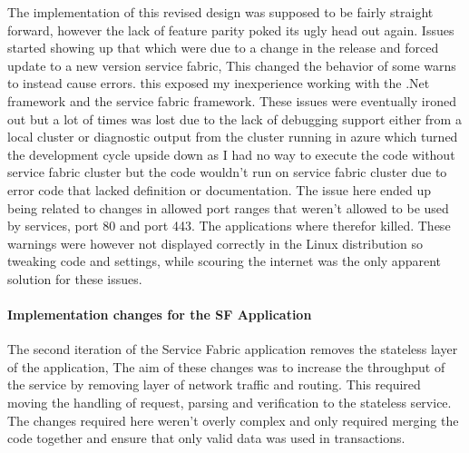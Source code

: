 \documentclass[a4paper,10pt,titlepage]{report}
\begin{document}
The implementation of this  revised design was supposed to be fairly straight forward, however the lack of feature parity poked its ugly head out again. Issues started showing up that which were due to a change in the release and forced update to a new version service fabric, This changed the behavior of some warns to instead cause errors. this exposed my inexperience working with the .Net framework and the service fabric framework. These issues were eventually ironed out but a lot of times was lost due to the lack of debugging support either from a local cluster or diagnostic output from the cluster running in azure which turned the development cycle upside down as I had no way to execute the code without service fabric cluster but the code wouldn't run on service fabric cluster due to error code that lacked definition or documentation. The issue here ended up being related to changes in allowed port ranges that weren't allowed to be used by services, port 80 and port 443. The applications where therefor killed. These warnings were however not displayed correctly in the Linux distribution so tweaking code and settings, while scouring the internet was the only apparent solution for these issues.

\paragraph*{Implementation changes for the SF Application}
The second iteration of the Service Fabric application removes the stateless layer of the application, The aim of these changes was to increase the throughput of the service by removing  layer of network traffic and routing. This required moving the handling of request, parsing and verification to the stateless service.   \\

The changes required here weren't overly complex and only required merging the code together and ensure that only valid data was used in transactions. 
\\
\end{document}
